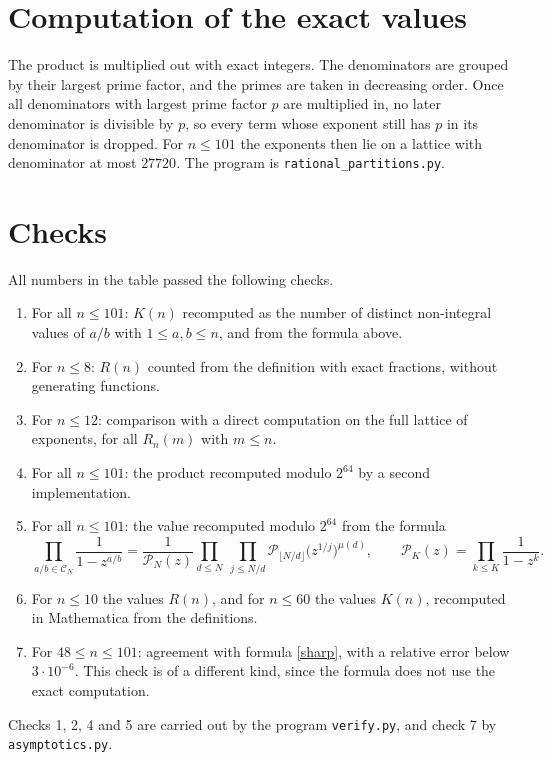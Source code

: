 \documentclass[10pt]{article}
\begin{document}
\section*{Computation of the exact values}
The product is multiplied out with exact integers. The denominators are grouped by their largest prime factor,
and the primes are taken in decreasing order. Once all denominators with largest prime factor $p$ are multiplied
in, no later denominator is divisible by $p$, so every term whose exponent still has $p$ in its denominator is
dropped. For $n\le 101$ the exponents then lie on a lattice with denominator at most $27720$.
The program is \texttt{rational\_partitions.py}.

\section*{Checks}
All numbers in the table passed the following checks.
\begin{enumerate}\itemsep0pt
\item For all $n\le 101$: $K(n)$ recomputed as the number of distinct non-integral values of $a/b$ with
$1\le a,b\le n$, and from the formula above.
\item For $n\le8$: $R(n)$ counted from the definition with exact fractions, without generating functions.
\item For $n\le12$: comparison with a direct computation on the full lattice of exponents, for all $R_n(m)$ with $m\le n$.
\item For all $n\le 101$: the product recomputed modulo $2^{64}$ by a second implementation.
\item For all $n\le 101$: the value recomputed modulo $2^{64}$ from the formula
\[
 \prod_{a/b\in\mathcal C_N}\frac1{1-z^{a/b}}=\frac1{\mathcal P_N(z)}\prod_{d\le N}\ \prod_{j\le N/d}
 \mathcal P_{\lfloor N/d\rfloor}\bigl(z^{1/j}\bigr)^{\mu(d)},\qquad \mathcal P_K(z)=\prod_{k\le K}\frac1{1-z^k}.
\]
\item For $n\le10$ the values $R(n)$, and for $n\le60$ the values $K(n)$, recomputed in Mathematica from the definitions.
\item For $48\le n\le 101$: agreement with formula \eqref{sharp}, with a relative error below $3\cdot10^{-6}$. This check is of a
different kind, since the formula does not use the exact computation.
\end{enumerate}
Checks 1, 2, 4 and 5 are carried out by the program \texttt{verify.py}, and check 7 by \texttt{asymptotics.py}.
\end{document}
